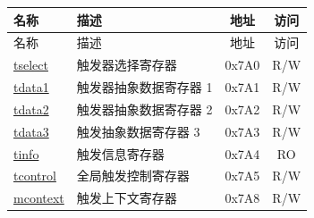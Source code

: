 \begin{longtable}{ | p{4.0cm} | p{8.4cm} | c | c| }
\hline\rowcolor{lightgray}
名称 & 描述 & 地址 & 访问 \\ \hline
\endfirsthead
\hline
\rowcolor{lightgray}
名称 & 描述 & 地址 & 访问  \\
\hline
\endhead
\endfoot
\hyperref[regdesc:TSELECT]{tselect} & 触发器选择寄存器 & 0x7A0 & R/W \\\hline
\hyperref[regdesc:TDATA1]{tdata1} & 触发器抽象数据寄存器 1 & 0x7A1 & R/W \\\hline
\hyperref[regdesc:TDATA2]{tdata2} & 触发器抽象数据寄存器 2 & 0x7A2 & R/W \\\hline
\hyperref[regdesc:TDATA3]{tdata3} & 触发抽象数据寄存器 3 & 0x7A3 & R/W \\\hline
\hyperref[regdesc:TINFO]{tinfo} & 触发信息寄存器 & 0x7A4 & RO \\\hline
\hyperref[regdesc:TCONTROL]{tcontrol} & 全局触发控制寄存器 & 0x7A5 & R/W \\\hline
\hyperref[regdesc:MCONTEXT]{mcontext} & 触发上下文寄存器 & 0x7A8 & R/W \\\hline
\end{longtable}
